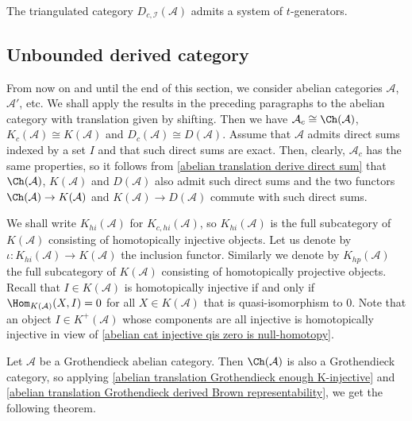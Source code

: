 \begin{proposition}\label{abelian translation Grothendieck t-generator if}
The triangulated category $D_{c,\mathcal{I}}(\mathcal{A})$ admits a system of $t$-generators.
\end{proposition}


\subsection{Unbounded derived category}
From now on and until the end of this section, we consider abelian categories $\mathcal{A}$, $\mathcal{A}'$, etc. We shall apply the results in the preceding paragraphs to the abelian category with translation given by shifting. Then we have $\mathcal{A}_c\cong\Ch(\mathcal{A})$, $K_c(\mathcal{A})\cong K(\mathcal{A})$ and $D_c(\mathcal{A})\cong D(\mathcal{A})$. Assume that $\mathcal{A}$ admits direct sums indexed by a set $I$ and that such direct sums are exact. Then, clearly, $\mathcal{A}_c$ has the same properties, so it follows from \cref{abelian translation derive direct sum} that $\Ch(\mathcal{A})$, $K(\mathcal{A})$ and $D(\mathcal{A})$ also admit such direct sums and the two functors $\Ch(\mathcal{A})\to K(\mathcal{A})$ and $K(\mathcal{A})\to D(\mathcal{A})$ commute with such direct sums.\par
We shall write $K_{hi}(\mathcal{A})$ for $K_{c,hi}(\mathcal{A})$, so $K_{hi}(\mathcal{A})$ is the full subcategory of $K(\mathcal{A})$ consisting of homotopically injective objects. Let us denote by $\iota:K_{hi}(\mathcal{A})\to K(\mathcal{A})$ the inclusion functor. Similarly we denote by $K_{hp}(\mathcal{A})$ the full subcategory of $K(\mathcal{A})$ consisting of homotopically projective objects. Recall that $I\in K(\mathcal{A})$ is homotopically injective if and only if $\Hom_{K(\mathcal{A})}(X,I)=0$ for all $X\in K(\mathcal{A})$ that is quasi-isomorphism to $0$. Note that an object $I\in K^+(\mathcal{A})$ whose components are all injective is homotopically injective in view of \cref{abelian cat injective qis zero is null-homotopy}.\par
Let $\mathcal{A}$ be a Grothendieck abelian category. Then $\Ch(\mathcal{A})$ is also a Grothendieck category, so applying \cref{abelian translation Grothendieck enough K-injective} and \cref{abelian translation Grothendieck derived Brown representability}, we get the following theorem.
